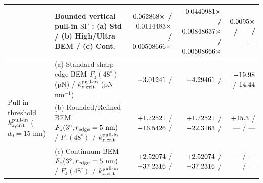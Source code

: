 \begin{table}[!htbp]
{\begin{tabular}{llrrr}
 & Bounded vertical pull-in $\text{SF}_z$: (a) Std / (b) High/Ultra BEM / (c) Cont. & $0.062868{}\times$ / $0.0114483{}\times$ / $0.00508666{}\times$ & $0.0440981{}\times$ / $0.00848637{}\times$ / $0.00508666{}\times$ & $\roundfour{\NatureFthreeOneoneoneRegthreeVerticalPullInSafetyFactor}\times$ / --- / --- \\
\midrule
\multirow{3}{*}{Pull-in threshold $k_{z,\rm crit}^{\rm pull\text{-}in}$ ($d_0=15\text{ nm}$)}
 & (a) Standard sharp-edge BEM $F_z(48^\circ)$ (pN) / $k_{z,\rm crit}^{\rm pull\text{-}in}$ (pN\,nm$^{-1}$) & $-3.01241{}$ / \NatureCantorNtwoHybridrzLateralStabilityKZCritPullInPnPerNm{} & $-4.29461{}$ / \NatureRotCeightCompactNtwoLateralStabilityKZCritPullInPnPerNm{} & $\roundtwo{\NatureFthreeOneoneoneFEngagedThreezerozerokPn}$ / $\roundtwo{\NatureFthreeOneoneoneRegoneKZCritPullInPnPerNm}$ \\
 & (b) Rounded/Refined BEM $F_z(3^\circ, r_{\rm edge}=5\text{ nm})$ / $F_z(48^\circ)$ / $k_{z,\rm crit}^{\rm pull\text{-}in}$ & $+1.72521{}$ / $-16.5426{}$ / \NatureCantorNtwoHybridrzDiscretizationPullInBoundsSharpUltraKzCritPullInPnPerNm{} & $+1.72521{}$ / $-22.3163{}$ / \NatureRotCeightCompactNtwoDiscretizationPullInBoundsSharpUltraKzCritPullInPnPerNm{} & $+\roundtwo{\NthreeUnithreedFoneoneoneRfivenmFzPn}$ / --- / --- \\
 & (c) Continuum BEM $F_z(3^\circ, r_{\rm edge}=5\text{ nm})$ / $F_z(48^\circ)$ / $k_{z,\rm crit}^{\rm pull\text{-}in}$ & $+2.52074{}$ / $-37.2316{}$ / \NatureCantorNtwoHybridrzDiscretizationPullInBoundsContinuumKzCritPullInPnPerNm{} & $+2.52074{}$ / $-37.2316{}$ / \NatureRotCeightCompactNtwoDiscretizationPullInBoundsContinuumKzCritPullInPnPerNm{} & --- / --- / --- \\

\end{tabular}}
\end{table}
